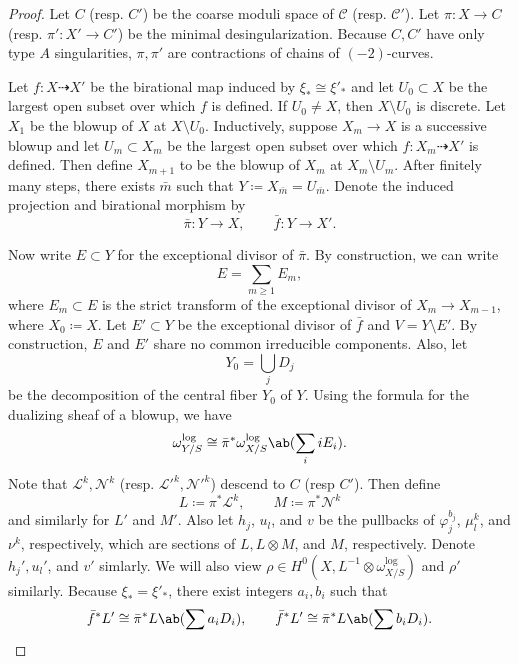\documentclass{amsart}
\theoremstyle{definition}
\theoremstyle{remark}
\theoremstyle{plain}
\theoremstyle{definition}
\theoremstyle{remark}
\newcommand{\mc}[1]{\mathcal{#1}}
\newcommand{\1}{\mathbf{1}}
\newcommand{\2}{\mathbf{2}}
\newcommand{\3}{\mathbf{3}}
\begin{document}
\begin{proof}
    Let $C$ (resp. $C'$) be the coarse moduli space of $\mc{C}$ (resp. $\mc{C}'$). Let $\pi \colon X \to C$ (resp. $\pi' \colon X' \to C'$) be the minimal desingularization. Because $C,C'$ have only type $A$ singularities, $\pi, \pi'$ are contractions of chains of $(-2)$-curves.

    Let $f \colon X \dashrightarrow X'$ be the birational map induced by $\xi_* \cong \xi'_*$ and let $U_0 \subset X$ be the largest open subset over which $f$ is defined. If $U_0 \neq X$, then $X \setminus U_0$ is discrete. Let $X_1$ be the blowup of $X$ at $X \setminus U_0$. Inductively, suppose $X_m \to X$ is a successive blowup and let $U_m \subset X_m$ be the largest open subset over which $f \colon X_m \dashrightarrow X'$ is defined. Then define $X_{m+1}$ to be the blowup of $X_m$ at $X_m \setminus U_m$. After finitely many steps, there exists $\bar{m}$ such that $Y \coloneqq X_{\bar{m}} = U_{\bar{m}}$. Denote the induced projection and birational morphism by
    \[ \bar{\pi} \colon Y \to X, \qquad \bar{f} \colon Y \to X'. \]

    Now write $E \subset Y$ for the exceptional divisor of $\bar{\pi}$. By construction, we can write
    \[ E = \sum_{m \geq 1} E_m, \]
    where $E_m \subset E$ is the strict transform of the exceptional divisor of $X_m \to X_{m-1}$, where $X_0 \coloneqq X$. Let $E' \subset Y$ be the exceptional divisor of $\bar{f}$ and $V = Y \setminus E'$. By construction, $E$ and $E'$ share no common irreducible components. Also, let
    \[ Y_0 = \bigcup_j D_j \]
    be the decomposition of the central fiber $Y_0$ of $Y$. Using the formula for the dualizing sheaf of a blowup, we have
    \begin{equation}\label{eqn:blowup}
        \omega_{Y/S}^{\log} \cong \bar{\pi}^* \omega_{X/S}^{\log}\ab(\sum_i i E_i). 
    \end{equation}
    Note that $\mc{L}^k, \mc{N}^k$ (resp. $\mc{L}'^k, \mc{N}'^k$) descend to $C$ (resp $C'$). Then define
    \[ L \coloneqq \pi^* \mc{L}^k, \qquad M \coloneqq \pi^* \mc{N}^k \]
    and similarly for $L'$ and $M'$. Also let $h_j$, $u_{l}$, and $v$ be the pullbacks of $\varphi_j^{b_j}$, $\mu_{l}^k$, and $\nu^k$, respectively, which are sections of $L, L \otimes M$, and $M$, respectively. Denote $h_j', u_{l}'$, and $v'$ simlarly. We will also view $\rho \in H^0(X, L^{-1} \otimes \omega_{X/S}^{\log})$ and $\rho'$ similarly. Because $\xi_* = \xi'_*$, there exist integers $a_i, b_i$ such that
    \begin{equation}\label{eqn:pullbacks}
        \bar{f}^* L' \cong \bar{\pi}^* L\ab(\sum a_i D_i), \qquad \bar{f}^* L' \cong \bar{\pi}^* L\ab(\sum b_i D_i). 
    \end{equation}


\end{proof}
\end{document}
